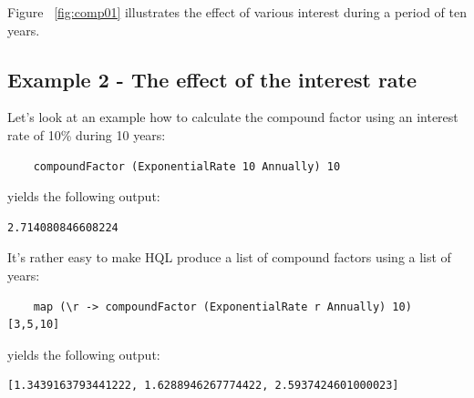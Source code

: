 \documentclass[11pt,a4paper]{article}
\numberwithin{equation}{section}
\begin{document}
	Figure ~\ref{fig:comp01} illustrates the effect of various interest during a period of ten years.

	\begin{minipage}{\linewidth}
	\label{fig:comp01}
	\end{minipage}

	\subsection{Example 2 - The effect of the interest rate}

	Let's look at an example how to calculate the compound factor using an interest rate of 10\% during 10 years:

	\FrameSep
	\begin{lstlisting}
	compoundFactor (ExponentialRate 10 Annually) 10	
	\end{lstlisting}
	\FrameSep

	yields the following output:
	\FrameSep
	\begin{lstlisting}[style=Output]
	2.714080846608224
	\end{lstlisting}

	It's rather easy to make HQL produce a list of compound factors using a list of years:

	\FrameSep
	\begin{lstlisting}
	map (\r -> compoundFactor (ExponentialRate r Annually) 10) [3,5,10]
	\end{lstlisting}
	\FrameSep

	yields the following output:
	\FrameSep
	\begin{lstlisting}[style=Output]
	[1.3439163793441222, 1.6288946267774422, 2.5937424601000023]
	\end{lstlisting}
\end{document}
